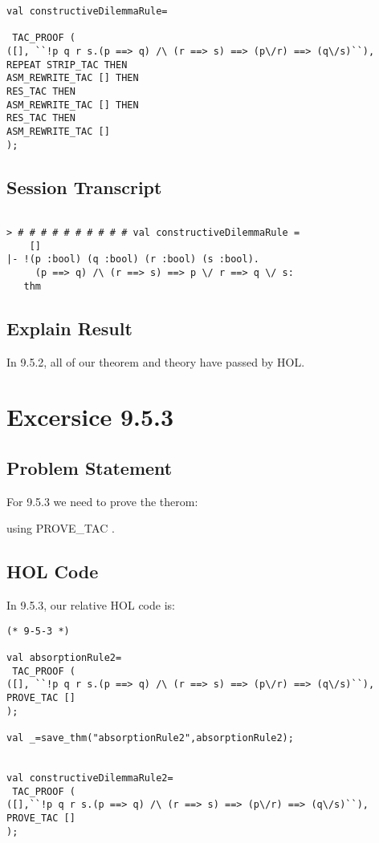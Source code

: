 \documentclass{report}
\begin{document}
\begin{lstlisting}[frame=trBL]
val constructiveDilemmaRule=

 TAC_PROOF (
([], ``!p q r s.(p ==> q) /\ (r ==> s) ==> (p\/r) ==> (q\/s)``),
REPEAT STRIP_TAC THEN
ASM_REWRITE_TAC [] THEN
RES_TAC THEN
ASM_REWRITE_TAC [] THEN
RES_TAC THEN
ASM_REWRITE_TAC []
);

\end{lstlisting}

\section{Session Transcript}
\label{Session Trans 952}
\setcounter{sessioncount}{0}
\begin{session}
  \begin{scriptsize}
\begin{verbatim}

> # # # # # # # # # # val constructiveDilemmaRule =
    []
|- !(p :bool) (q :bool) (r :bool) (s :bool).
     (p ==> q) /\ (r ==> s) ==> p \/ r ==> q \/ s:
   thm

\end{verbatim}
  \end{scriptsize}
\end{session}
\section{Explain Result}
\label{explain result 952}
In 9.5.2, all of our theorem and theory have passed by HOL.


\chapter{Excersice 9.5.3}
\label{Ex 953}
\section{Problem Statement}
\label{Problem State 953}
For 9.5.3 we need to prove the therom:


using PROVE_TAC .

\section{HOL Code}
\label{HOl Code 953}
In 9.5.3, our relative HOL code is:
\begin{lstlisting}[frame=trBL]
(* 9-5-3 *)

val absorptionRule2=
 TAC_PROOF (
([], ``!p q r s.(p ==> q) /\ (r ==> s) ==> (p\/r) ==> (q\/s)``),
PROVE_TAC []
);

val _=save_thm("absorptionRule2",absorptionRule2);


val constructiveDilemmaRule2=
 TAC_PROOF (
([],``!p q r s.(p ==> q) /\ (r ==> s) ==> (p\/r) ==> (q\/s)``),
PROVE_TAC []
);
\end{lstlisting}
\end{document}
